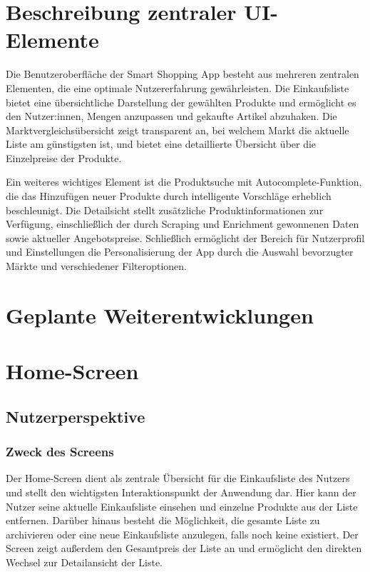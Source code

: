 \documentclass[12pt, a4paper]{report} %
\begin{document}
\section{Beschreibung zentraler UI-Elemente}
Die Benutzeroberfläche der Smart Shopping App besteht aus mehreren zentralen Elementen, die eine optimale Nutzererfahrung gewährleisten. Die Einkaufsliste bietet eine übersichtliche Darstellung der gewählten Produkte und ermöglicht es den Nutzer:innen, Mengen anzupassen und gekaufte Artikel abzuhaken. Die Marktvergleichsübersicht zeigt transparent an, bei welchem Markt die aktuelle Liste am günstigsten ist, und bietet eine detaillierte Übersicht über die Einzelpreise der Produkte.

Ein weiteres wichtiges Element ist die Produktsuche mit Autocomplete-Funktion, die das Hinzufügen neuer Produkte durch intelligente Vorschläge erheblich beschleunigt. Die Detailsicht stellt zusätzliche Produktinformationen zur Verfügung, einschließlich der durch Scraping und Enrichment gewonnenen Daten sowie aktueller Angebotspreise. Schließlich ermöglicht der Bereich für Nutzerprofil und Einstellungen die Personalisierung der App durch die Auswahl bevorzugter Märkte und verschiedener Filteroptionen.

\section{Geplante Weiterentwicklungen}

\section{Home-Screen}
\label{sec:home_screen}

\subsection{Nutzerperspektive}

\subsubsection{Zweck des Screens}
Der Home-Screen dient als zentrale Übersicht für die Einkaufsliste des Nutzers und stellt den wichtigsten Interaktionspunkt der Anwendung dar. Hier kann der Nutzer seine aktuelle Einkaufsliste einsehen und einzelne Produkte aus der Liste entfernen. Darüber hinaus besteht die Möglichkeit, die gesamte Liste zu archivieren oder eine neue Einkaufsliste anzulegen, falls noch keine existiert. Der Screen zeigt außerdem den Gesamtpreis der Liste an und ermöglicht den direkten Wechsel zur Detailansicht der Liste.
\end{document}
